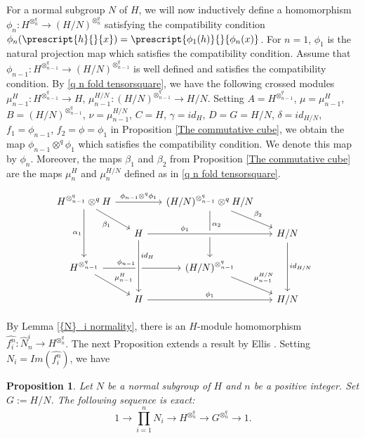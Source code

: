 \documentclass[12pt]{elsarticle}
\newtheorem*{main corollary*}{Main Corollary}
\newtheorem{prop}[theorem]{Proposition}
\theoremstyle{definition}
\newcommand{\tens}{
	\otimes^q}
\begin{document}
For a normal subgroup $N$ of $H$, we will now inductively define a homomorphism ${\phi_n: H^{\tens_n} \longrightarrow(H/N)^{\tens_n}}$ satisfying the compatibility condition $\phi_n(\prescript{h}{}{x})=\prescript{\phi_1(h)}{}{\phi_n(x)}$. For $n=1$, $\phi_1$ is the natural projection map which satisfies the compatibility condition. Assume that $\phi_{n-1}: H^{\tens_{n-1}} \longrightarrow (H/N)^{\tens_{n-1}}$ is well defined and satisfies the compatibility condition. By \eqref{q n fold tensorsquare}, we have the following crossed modules $\mu_{n-1}^{H}: H^{\tens_{n-1}} \longrightarrow H$, $\mu_{n-1}^{H/N}: (H/N)^{\tens_{n-1}} \longrightarrow H/N$. Setting $A=H^{\tens_{n-1}}$, $\mu= \mu_{n-1}^H$, $B=(H/N)^{\tens_{n-1}}$, $\nu=\mu_{n-1}^{H/N}$, $C=H$, $\gamma=id_H$, $D=G=H/N$, $\delta=id_{H/N}$, $f_1=\phi_{n-1}$, $f_2=\phi=\phi_1$ in Proposition \ref{The commutative cube}, we obtain the map $\phi_{n-1} \tens \phi_1$ which satisfies the compatibility condition. We denote this map by $\phi_n$. Moreover, the maps $\beta_1$ and $\beta_2$ from Proposition \ref{The commutative cube} are the maps $\mu_n^H$ and $\mu_n^{H/N}$ defined as in \eqref{q n fold tensorsquare}.

\begin{equation} \label{special cube for exact sequence for Lazard}
    \begin{tikzcd}[row sep=1.5em, column sep = 1.5em]
    H^{\tens_{n-1}} \tens H \arrow[rr,"\phi_{n-1} \tens \phi_1"] \arrow[dr, swap,"\beta_1"] \arrow[dd, swap,"\alpha_1"] &&
    (H/N)^{\tens_{n-1}} \tens H/N \arrow[dd,"\alpha_2", pos=.3] \arrow[dr,"\beta_2"] \\
    & H \arrow[rr, "\phi_1", pos=.3, crossing over] &&
    H/N \arrow[dd,"id_{H/N}"] \\
    H^{\tens_{n-1}} \arrow[rr,"\phi_{n-1}",pos=.3] \arrow[dr, "\mu_{n-1}^H"] && (H/N)^{\tens_{n-1}} \arrow[dr,"\mu_{n-1}^{H/N}"] \\
    & H \arrow[rr,"\phi_1"] \arrow[from=uu,"id_H", pos=.3, crossing over]&& H/N
    \end{tikzcd}
\end{equation}

By Lemma \ref{{N}_i normality}, there is an $H$-module homomorphism $\hat{f_i^n}:\hat{N}_n^i \to H^{\tens_n}$. The next Proposition extends a result by Ellis \cite[Proposition 7]{Ellis1995}. Setting $N_i= Im (\hat{f_i^n})$, we have

 \begin{prop} \label{nfold_qtensor_exact_sequence}
     Let $N$ be a normal subgroup of $H$ and $n$ be a positive integer. Set $G:=H/N$. The following sequence is exact: 
        \begin{equation*}
		   1 \to \prod \limits_{i=1}^n N_i \to H^{\otimes^{q}_n} \to G^{\otimes^{q}_n} \to 1.
        \end{equation*}
 \end{prop}
\end{document}
